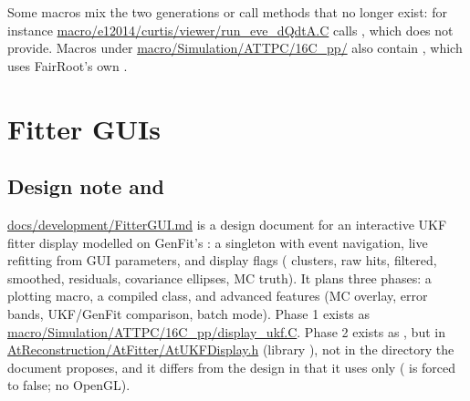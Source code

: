 Some macros mix the two generations or call methods that no longer exist: for instance
\url{macro/e12014/curtis/viewer/run_eve_dQdtA.C} calls , which
 does not provide. Macros under \url{macro/Simulation/ATTPC/16C_pp/} also
contain , which uses FairRoot's own .

\section{Fitter GUIs}
\label{sec:vis-fitter}

\subsection{Design note and }

\url{docs/development/FitterGUI.md} is a design document for an interactive UKF fitter display
modelled on GenFit's : a singleton with event navigation, live refitting from
GUI parameters, and display flags ( clusters,  raw hits,  filtered,
 smoothed,  residuals,  covariance ellipses,  MC truth). It plans
three phases: a plotting macro, a compiled class, and advanced features (MC overlay, error bands,
UKF/GenFit comparison, batch mode). Phase 1 exists as
\url{macro/Simulation/ATTPC/16C_pp/display_ukf.C}. Phase 2 exists as , but in
\url{AtReconstruction/AtFitter/AtUKFDisplay.h} (library ), not in the
 directory the document proposes, and it differs from the
design in that it uses only  ( is forced to false; no OpenGL).

